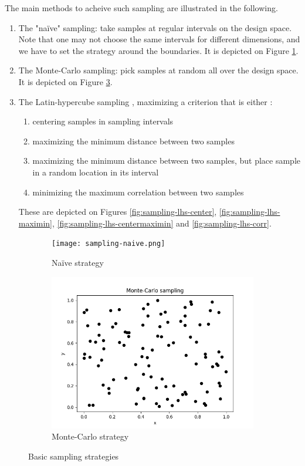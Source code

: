 The main methods to acheive such sampling are \cite{doe} illustrated in the following.
\begin{enumerate}
    \item The "naïve" sampling: take samples at regular intervals on the design space. Note that one may not choose the same intervals for different dimensions, and we have to set the strategy around the boundaries. It is depicted on Figure \ref{fig:sampling-naive}.
    \item The Monte-Carlo sampling: pick samples at random all over the design space. It is depicted on Figure \ref{fig:sampling-monte-carlo}.
    \item The Latin-hypercube sampling \cite{wiki-lhs}, maximizing a criterion that is either \cite{pydoe-docs}:
    \begin{enumerate}
        \item centering samples in sampling intervals
        \item maximizing the minimum distance between two samples
        \item maximizing the minimum distance between two samples, but place sample in a random location in its interval
        \item minimizing the maximum correlation between two samples
    \end{enumerate}
    These are depicted on Figures \ref{fig:sampling-lhs-center}, \ref{fig:sampling-lhs-maximin}, \ref{fig:sampling-lhs-centermaximin} and \ref{fig:sampling-lhs-corr}.
\end{enumerate}

\begin{figure}[h!]
    \centering
    \begin{subfigure}[b]{0.49\textwidth}
        \texttt{[image: sampling-naive.png]}
        \caption{Naïve strategy}
        \label{fig:sampling-naive}
    \end{subfigure}
    \hfill
    \begin{subfigure}[b]{0.49\textwidth}
        \includegraphics[width=\textwidth]{resources/images/sampling-monte-carlo.png}
        \caption{Monte-Carlo strategy}
        \label{fig:sampling-monte-carlo}
    \end{subfigure}
    \caption{Basic sampling strategies}
\end{figure}

